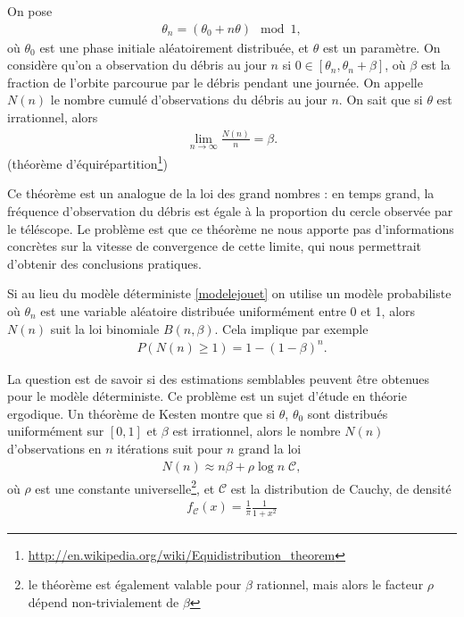 \documentclass[a4paper,11pt]{article}
\renewcommand{\geq}{\geqslant}
\numberwithin{section}{part}
\begin{document}
%   
%   
  

On pose
\begin{align}
  \label{modelejouet}
  \theta_{n} = (\theta_{0} + n \theta) \mod 1,
\end{align}
où $\theta_{0}$ est une phase initiale aléatoirement distribuée, et
$\theta$ est un paramètre. On considère qu'on a observation du débris
au jour $n$ si $0 \in [\theta_{n}, \theta_{n}+\beta]$, où $\beta$ est
la fraction de l'orbite parcourue par le débris pendant une
journée. On appelle $N(n)$ le nombre cumulé d'observations du débris
au jour $n$. On sait que si $\theta$ est irrationnel, alors
\begin{align}
  \label{largenumbers}
  \lim_{n\to\infty} \frac{N(n)} n = \beta.
\end{align}
(théorème d'équirépartition\footnote{\url{http://en.wikipedia.org/wiki/Equidistribution_theorem}})

Ce théorème est un analogue de la loi des grand nombres : en temps
grand, la fréquence d'observation du débris est égale à la proportion
du cercle observée par le téléscope. Le problème est que ce théorème
ne nous apporte pas d'informations concrètes sur la vitesse de
convergence de cette limite, qui nous permettrait d'obtenir des
conclusions pratiques. 

Si au lieu du modèle déterministe \eqref{modelejouet} on utilise un
modèle probabiliste où $\theta_{n}$ est une variable aléatoire
distribuée uniformément entre 0 et 1, alors $N(n)$ suit la loi
binomiale $B(n,\beta)$. Cela implique par exemple
\begin{align}
  P(N(n) \geq 1) = 1 - (1-\beta)^{n}.
\end{align}

La question est de savoir si des estimations semblables peuvent être
obtenues pour le modèle déterministe. Ce problème est un sujet d'étude
en théorie ergodique. Un théorème de Kesten\cite{kesten} montre que si
$\theta$, $\theta_{0}$ sont distribués uniformément sur $[0,1]$ et
$\beta$ est irrationnel, alors le nombre $N(n)$ d'observations en $n$
itérations suit pour $n$ grand la loi
\begin{align}
  N(n) \approx n \beta + {\rho} \log n\; \mathcal C,
\end{align}
où $\rho$ est une constante universelle\footnote{le théorème est
  également valable pour $\beta$ rationnel, mais alors le facteur
  $\rho$ dépend non-trivialement de $\beta$}, et $\mathcal C$ est la
distribution de Cauchy, de densité
\begin{align}
  f_{\mathcal C}(x) = \frac 1 \pi \frac 1 {1+x^{2}}
\end{align}
\end{document}
